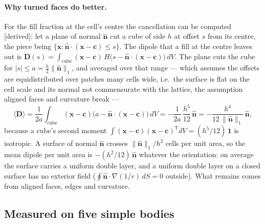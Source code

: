 \documentclass[10pt,a4paper]{article}
\newcommand{\vn}{\hat{\mathbf{n}}}
\newcommand{\tagD}{\textsf{\small[derived]}}
\begin{document}
\paragraph{Why turned faces do better.} For the fill fraction at the cell's centre the cancellation can be computed \tagD: let a plane of normal $\vn$ cut a cube of side $h$ at
offset $s$ from its centre, the piece being $\{\mathbf{x}: \vn\cdot(\mathbf{x}-\mathbf{c})\le s\}$.
The dipole that a fill at the centre leaves out is $\mathbf{D}(s)=\int_\mathrm{cube}(\mathbf{x}-\mathbf{c})
\,H\bigl(s-\vn\cdot(\mathbf{x}-\mathbf{c})\bigr)\,dV$. The plane cuts the cube for
$|s|\le a = \tfrac h2\|\vn\|_1$, and averaged over that range --- which assumes the offsets are
equidistributed over patches many cells wide, i.e.\ the surface is flat on the cell scale and its
normal not commensurate with the lattice, the assumption aligned faces and curvature break ---
\begin{equation}
\langle\mathbf{D}\rangle = \frac1{2a}\int_\mathrm{cube}(\mathbf{x}-\mathbf{c})\bigl(a-\vn\cdot(\mathbf{x}-\mathbf{c})\bigr)\,dV
= -\frac1{2a}\,\frac{h^5}{12}\,\vn = -\frac{h^4}{12\,\|\vn\|_1}\,\vn,
\end{equation}
because a cube's second moment $\int(\mathbf{x}-\mathbf{c})(\mathbf{x}-\mathbf{c})^{\mathsf T}dV =
(h^5/12)\,\mathbf{1}$ is isotropic. A surface of normal $\vn$ crosses $\|\vn\|_1/h^2$ cells per unit
area, so the mean dipole per unit area is $-(h^2/12)\,\vn$ whatever the orientation: on average the
surface carries a uniform double layer, and a uniform double layer on a closed surface has no exterior
field ($\oint\vn\cdot\nabla(1/r)\,dS = 0$ outside). What remains comes from aligned faces, edges and
curvature.

\subsection{Measured on five simple bodies}\label{sec:moments}
\end{document}
